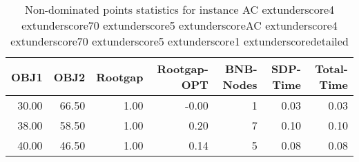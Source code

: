 \begin{table}
\caption{Non-dominated points statistics for instance AC	extunderscore4	extunderscore70	extunderscore5	extunderscoreAC	extunderscore4	extunderscore70	extunderscore5	extunderscore1	extunderscoredetailed}
\label{tab:stats/AC_4_70_5_AC_4_70_5_1_detailed}
\begin{tabular}{rrrrrrr}
\toprule
OBJ1 & OBJ2 & Rootgap & Rootgap-OPT & BNB-Nodes & SDP-Time & Total-Time \\
\midrule
30.00 & 66.50 & 1.00 & -0.00 & 1 & 0.03 & 0.03 \\
38.00 & 58.50 & 1.00 & 0.20 & 7 & 0.10 & 0.10 \\
40.00 & 46.50 & 1.00 & 0.14 & 5 & 0.08 & 0.08 \\
\bottomrule
\end{tabular}
\end{table}
